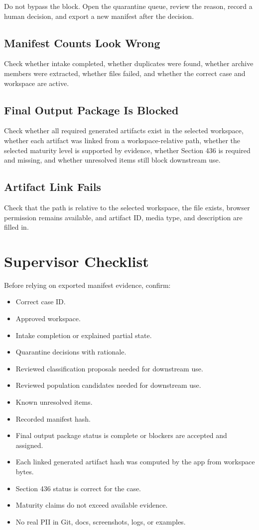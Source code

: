 Do not bypass the block. Open the quarantine queue, review the reason, record a human decision, and export a new manifest after the decision.

\section{Manifest Counts Look Wrong}

Check whether intake completed, whether duplicates were found, whether archive members were extracted, whether files failed, and whether the correct case and workspace are active.

\section{Final Output Package Is Blocked}

Check whether all required generated artifacts exist in the selected workspace, whether each artifact was linked from a workspace-relative path, whether the selected maturity level is supported by evidence, whether Section 436 is required and missing, and whether unresolved items still block downstream use.

\section{Artifact Link Fails}

Check that the path is relative to the selected workspace, the file exists, browser permission remains available, and artifact ID, media type, and description are filled in.

\chapter{Supervisor Checklist}

Before relying on exported manifest evidence, confirm:

\begin{itemize}
  \item Correct case ID.
  \item Approved workspace.
  \item Intake completion or explained partial state.
  \item Quarantine decisions with rationale.
  \item Reviewed classification proposals needed for downstream use.
  \item Reviewed population candidates needed for downstream use.
  \item Known unresolved items.
  \item Recorded manifest hash.
  \item Final output package status is complete or blockers are accepted and assigned.
  \item Each linked generated artifact hash was computed by the app from workspace bytes.
  \item Section 436 status is correct for the case.
  \item Maturity claims do not exceed available evidence.
  \item No real PII in Git, docs, screenshots, logs, or examples.
\end{itemize}


